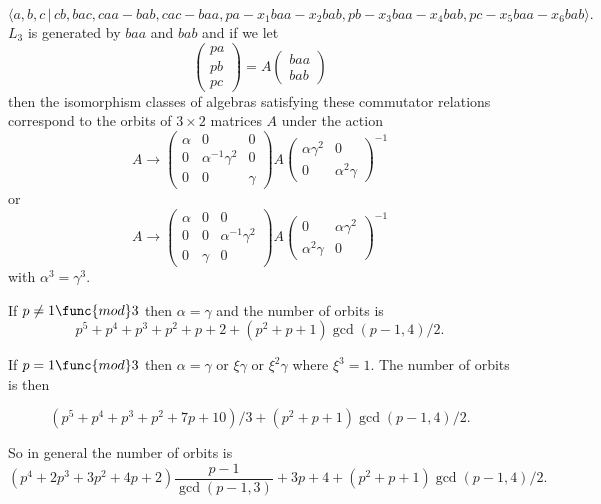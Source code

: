 \documentclass[10pt]{article}
\begin{document}
\begin{equation}
\langle
a,b,c\,|%
\,cb,bac,caa-bab,cac-baa,pa-x_{1}baa-x_{2}bab,pb-x_{3}baa-x_{4}bab,pc-x_{5}baa-x_{6}bab\rangle .
\tag{7.773}
\end{equation}%
$L_{3}$ is generated by $baa$ and $bab$ and if we let 
\[
\left( 
\begin{array}{l}
pa \\ 
pb \\ 
pc%
\end{array}%
\right) =A\left( 
\begin{array}{l}
baa \\ 
bab%
\end{array}%
\right) 
\]%
then the isomorphism classes of algebras satisfying these commutator
relations correspond to the orbits of $3\times 2$ matrices $A$ under the
action 
\[
A\rightarrow \left( 
\begin{array}{lll}
\alpha & 0 & 0 \\ 
0 & \alpha ^{-1}\gamma ^{2} & 0 \\ 
0 & 0 & \gamma%
\end{array}%
\right) A\left( 
\begin{array}{ll}
\alpha \gamma ^{2} & 0 \\ 
0 & \alpha ^{2}\gamma%
\end{array}%
\right) ^{-1} 
\]%
or 
\[
A\rightarrow \left( 
\begin{array}{lll}
\alpha & 0 & 0 \\ 
0 & 0 & \alpha ^{-1}\gamma ^{2} \\ 
0 & \gamma & 0%
\end{array}%
\right) A\left( 
\begin{array}{ll}
0 & \alpha \gamma ^{2} \\ 
\alpha ^{2}\gamma & 0%
\end{array}%
\right) ^{-1} 
\]%
with $\alpha ^{3}=\gamma ^{3}$.

If $p\neq 1\func{mod}3$ then $\alpha =\gamma $ and the number of orbits is 
\[
p^5+p^4+p^3+p^2+p+2+(p^2+p+1)\gcd (p-1,4)/2. 
\]

If $p=1\func{mod}3$ then $\alpha =\gamma $ or $\xi \gamma $ or $\xi ^2\gamma 
$ where $\xi ^3=1$. The number of orbits is then

\[
(p^{5}+p^{4}+p^{3}+p^{2}+7p+10)/3+(p^{2}+p+1)\gcd (p-1,4)/2. 
\]

So in general the number of orbits is 
\[
\allowbreak (p^{4}+2p^{3}+3p^{2}+4p+2)\frac{p-1}{\gcd (p-1,3)}%
+3p+4+(p^{2}+p+1)\gcd (p-1,4)/2. 
\]
\end{document}
